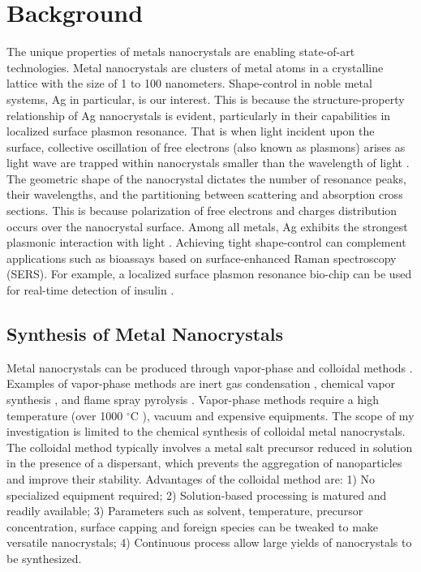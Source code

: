 \section{Background}

The unique properties of metals nanocrystals are enabling state-of-art technologies.
Metal nanocrystals are clusters of metal atoms in a crystalline lattice with the size of 1 to 100 nanometers.
Shape-control in noble metal systems, Ag in particular, is our interest.
This is because the structure-property relationship of Ag nanocrystals is evident, particularly in their capabilities in localized surface plasmon resonance.
That is when light incident upon the surface, collective oscillation of free electrons (also known as plasmons) arises as light wave are trapped within nanocrystals smaller than the wavelength of light \cite{Petryayeva_2011}.
The geometric shape of the nanocrystal dictates the number of resonance peaks, their wavelengths, and the partitioning between scattering and absorption cross sections.
This is because polarization of free electrons and charges distribution occurs over the nanocrystal surface.
Among all metals, Ag exhibits the strongest plasmonic interaction with light \cite{Lu_2009}.
Achieving tight shape-control can complement applications such as bioassays based on surface-enhanced Raman spectroscopy (SERS).
For example, a localized surface plasmon resonance bio-chip can be used for real-time detection of insulin \cite{Hiep_2008}.

\subsection{Synthesis of Metal Nanocrystals}

Metal nanocrystals can be produced through vapor-phase \cite{Swihart_2003} and colloidal methods \cite{Tao_2008}. Examples of vapor-phase methods are inert gas condensation \cite{Wegner_2002,Simchi_2007}, chemical vapor synthesis \cite{Lee_2012,Ostraat_2001}, and flame spray pyrolysis \cite{Teoh_2010}. 
Vapor-phase methods require a high temperature (over 1000 $^{\circ}$C \cite{Smetana_2005}), vacuum and expensive equipments.
The scope of my investigation is limited to the chemical synthesis of colloidal metal nanocrystals.
The colloidal method typically involves a metal salt precursor reduced in solution in the presence of a dispersant, which prevents the aggregation of nanoparticles and improve their stability.
Advantages of the colloidal method are: 
1) No specialized equipment required; 
2) Solution-based processing is matured and readily available;
3) Parameters such as solvent, temperature, precursor concentration, surface capping and foreign species can be tweaked to make versatile nanocrystals;
4) Continuous process allow large yields of nanocrystals to be synthesized.

